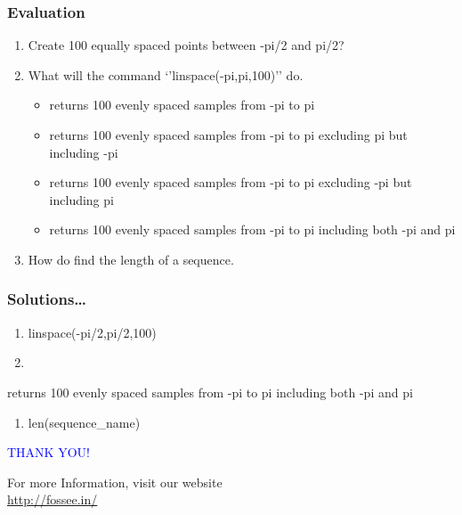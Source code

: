 \documentclass[presentation]{beamer}
\begin{document}
\begin{frame}
\frametitle{Evaluation}
\label{sec-7}


\begin{enumerate}
\item Create 100 equally spaced points between -pi/2 and pi/2?
\item What will the command `'linspace(-pi,pi,100)'' do.
\begin{itemize}
\item returns 100 evenly spaced samples from -pi to pi
\item returns 100 evenly spaced samples from -pi to pi excluding pi but including -pi
\item returns 100 evenly spaced samples from -pi to pi excluding -pi but including pi
\item returns 100 evenly spaced samples from -pi to pi including both -pi and pi
\end{itemize}
\item How do find the length of a sequence.
\end{enumerate}
\end{frame}
\begin{frame}
\frametitle{Solutions\ldots{}}
\label{sec-8}


\begin{enumerate}
\item linspace(-pi/2,pi/2,100)
\item 
\end{enumerate}
returns 100 evenly spaced samples from -pi to pi including both -pi and pi

\begin{enumerate}
\item len(sequence\_name)
\end{enumerate}
\end{frame}
\begin{frame}

 \begin{block}{}
  \begin{center}
  \textcolor{blue}{\Large THANK YOU!} 
  \end{center}
  \end{block}
\begin{block}{}
  \begin{center}
    For more Information, visit our website\\
    \url{http://fossee.in/}
  \end{center}  
  \end{block}
\end{frame}
\end{document}
